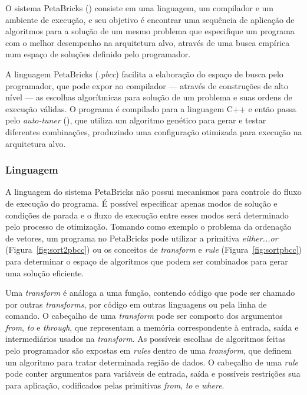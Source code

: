 \documentclass[a4paper, 12pt]{article}
\begin{document}
O sistema PetaBricks (\citet{ansel2009petabricks, ansel2014phd,
ansel:xrds:2010, mitcsail-tr:2014})
consiste em uma linguagem, um compilador e um ambiente de execução,
e seu objetivo é encontrar uma sequência de aplicação de algoritmos
para a solução de um mesmo problema que especifique um programa com o melhor
desempenho na arquitetura alvo, através de uma busca empírica num espaço
de soluções definido pelo programador.

A linguagem PetaBricks (\emph{.pbcc}) facilita a
elaboração do espaço de busca pelo programador, que pode expor ao compilador
--- através de construções de alto nível --- as escolhas algorítmicas
para solução de um problema e suas ordens de execução válidas. O programa é
compilado para a linguagem C++ e então passa pelo \emph{auto-tuner}
(\citet{ansel2011efficient}), que utiliza um algoritmo genético para gerar e
testar diferentes combinações, produzindo uma configuração otimizada para
execução na arquitetura alvo.

\subsubsection{Linguagem}

A linguagem do sistema PetaBricks não possui mecanismos para controle do fluxo
de execução do programa. É possível especificar apenas modos de solução e
condições de parada e o fluxo de execução entre esses modos será determinado
pelo processo de otimização.
Tomando como exemplo o problema da ordenação de vetores, um programa no
PetaBricks pode utilizar a primitiva \emph{either...or}
(Figura~\ref{fig:sort2pbcc}) ou os conceitos de \emph{transform} e \emph{rule}
(Figura~\ref{fig:sortpbcc}) para determinar o espaço de algoritmos que podem
ser combinados para gerar uma solução eficiente.

Uma \emph{transform} é análoga a uma função, contendo código que pode
ser chamado por outras \emph{transforms}, por código em outras linguagens
ou pela linha de comando. O cabeçalho de uma \emph{transform} pode ser composto
dos argumentos \emph{from}, \emph{to} e \emph{through}, que representam a
memória correspondente à entrada, saída e intermediários usados na
\emph{transform}.
As possíveis escolhas de algoritmos feitas pelo programador são expostas
em \emph{rules} dentro de uma \emph{transform}, que definem um algoritmo
para tratar determinada região de dados. O cabeçalho de uma \emph{rule} pode
conter argumentos para variáveis de entrada, saída e possíveis restrições sua
para aplicação, codificados pelas primitivas \emph{from}, \emph{to} e
\emph{where}.
\end{document}
